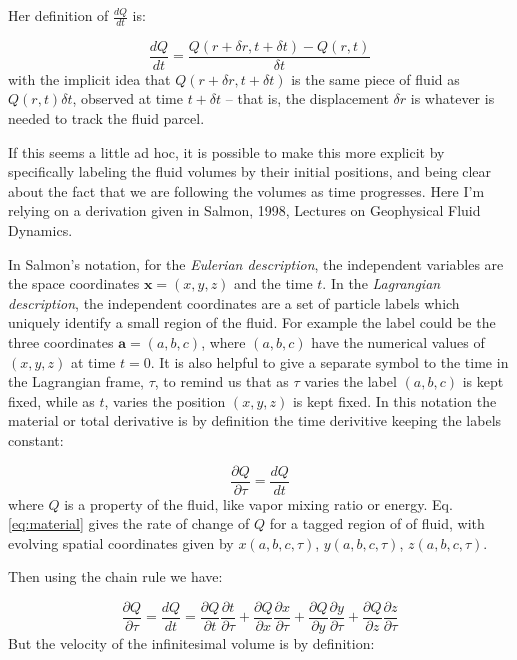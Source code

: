 \documentclass[12pt]{article}
\begin{document}
Her definition of $\frac{ dQ}{dt}$ is:


\begin{equation}
  \label{eq:dqdt}
  \frac{ dQ}{dt} = \frac{ Q(r + \delta r, t + \delta t) - Q(r,t) }{\delta t}
\end{equation}
with the implicit idea that $Q(r + \delta r, t + \delta t)$ is the same piece of fluid
as $Q(r,t) {\delta t}$, observed at time $t + \delta t$ -- that is, the displacement
$\delta r$ is whatever is needed to track the fluid parcel.

If this seems a little ad hoc,
it is possible to make this more
explicit by specifically labeling the fluid volumes by their
initial positions, and being clear about the fact that we
are following the volumes as time progresses.  Here I'm
relying on a derivation 
given in Salmon, 1998, Lectures on Geophysical Fluid Dynamics.

In Salmon's notation, for the
\textit{Eulerian description}, the independent variables are the space
coordinates $\mathbf{x}=(x,y,z)$ and the time $t$.  In the
\textit{Lagrangian description}, the independent coordinates are a
set of particle labels which uniquely identify a small region of the
fluid.  For example the label could be the three coordinates
$\mathbf{a}=(a,b,c)$, where $(a,b,c)$ have the numerical values
of $(x,y,z)$ at time $t=0$.  It is also helpful to give a separate
symbol to the time in the Lagrangian frame, $\tau$, to remind us that
as $\tau$ varies the label $(a,b,c)$ is kept fixed, while as $t$, varies
the position $(x,y,z)$ is kept fixed.  In this notation the material
or total derivative is by definition the time derivitive keeping the
labels constant:

\begin{equation}
  \label{eq:material}
  \frac{\partial Q}{\partial \tau} = \frac{d Q}{dt}
\end{equation}
where $Q$ is a property of the fluid, like vapor mixing ratio
or energy. Eq. \eqref{eq:material} gives  the rate of change of $Q$ for a tagged region of 
of fluid, with evolving spatial coordinates given by $x(a,b,c,\tau)$,
$y(a,b,c,\tau)$, $z(a,b,c,\tau)$.

Then using the chain rule we have:

\begin{equation}
  \label{eq:chain}
  \frac{\partial Q}{\partial \tau} = \frac{d Q}{dt} = 
\frac{\partial Q}{\partial t} \frac{\partial t}{\partial \tau} + 
\frac{\partial Q}{\partial x} \frac{\partial x}{\partial \tau} +
\frac{\partial Q}{\partial y} \frac{\partial y}{\partial \tau} +
\frac{\partial Q}{\partial z} \frac{\partial z}{\partial \tau}
\end{equation}
But the velocity of the infinitesimal volume is by definition:
\end{document}
